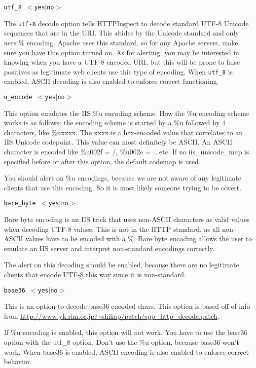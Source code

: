 \documentclass[english]{report}
\newcounter{slistnum}
\newenvironment{slist}
{ \begin{list}{ {\bf \arabic{slistnum}.} }{\usecounter{slistnum} } }
{ \end{list} }
\begin{document}
\begin{slist}
\item \texttt{utf\_8 $<$yes$|$no$>$}

The \texttt{utf-8} decode option tells HTTPInspect to decode standard UTF-8 Unicode
sequences that are in the URI.  This abides by the Unicode standard and only
uses \% encoding.  Apache uses this standard, so for any Apache servers, make
sure you have this option turned on.  As for alerting, you may be interested in
knowing when you have a UTF-8 encoded URI, but this will be prone to false
positives as legitimate web clients use this type of encoding.  When \texttt{utf\_8} is
enabled, ASCII decoding is also enabled to enforce correct functioning.  

\item \texttt{u\_encode $<$yes$|$no$>$}

This option emulates the IIS \%u encoding scheme.  How the \%u encoding scheme
works is as follows:  the encoding scheme is started by a \%u followed by 4
characters, like \%uxxxx.  The xxxx is a hex-encoded value that correlates to an IIS
Unicode codepoint.  This value can most definitely be ASCII.  An ASCII character is
encoded like \%u002f = /, \%u002e = ., etc.  If no iis\_unicode\_map is specified
before or after this option, the default codemap is used.

You should alert on \%u encodings, because we are not aware of any legitimate
clients that use this encoding.  So it is most likely someone trying to be
covert.

\item \texttt{bare\_byte $<$yes$|$no$>$}

Bare byte encoding is an IIS trick that uses non-ASCII characters as valid values when
decoding UTF-8 values.  This is not in the HTTP standard, as all non-ASCII
values have to be encoded with a \%.  Bare byte encoding allows the user to
emulate an IIS server and interpret non-standard encodings correctly.

The alert on this decoding should be enabled, because there are no legitimate
clients that encode UTF-8 this way since it is non-standard.

\item \texttt{base36 $<$yes$|$no$>$}

This is an option to decode base36 encoded chars.  This option is based off of
info from 
\url{http://www.yk.rim.or.jp/~shikap/patch/spp\_http\_decode.patch}.

If \%u encoding is enabled, this option will not work.  You have to use the
base36 option with the utf\_8 option.  Don't use the \%u option, because base36
won't work.  When base36 is enabled, ASCII encoding is also enabled to enforce correct
behavior.


\end{slist}
\end{document}
